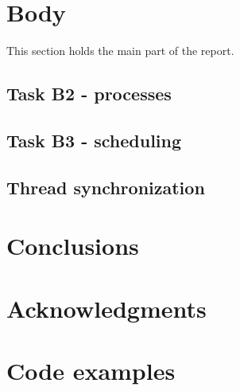 \documentclass{acm_proc_article-sp}
\begin{document}
\section{Body}
This section holds the main part of the report.



\subsection{Task B2 - processes}


\subsection{Task B3 - scheduling}


\subsection{Thread synchronization}


\section{Conclusions}


\section{Acknowledgments}






%
%
\appendix



\section{Code examples}
\end{document}
